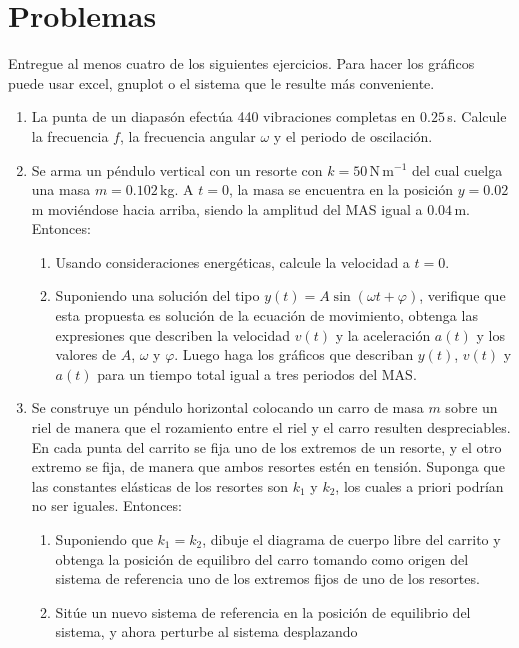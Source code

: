 \documentclass[a4paper,12pt]{article}
\begin{document}
\section{Problemas}

Entregue al menos cuatro de los siguientes ejercicios. Para hacer los gráficos
puede usar excel, gnuplot o el sistema que le resulte más conveniente. 

\begin{enumerate}
	\item La punta de un diapasón efectúa 440 vibraciones completas en
		$0.25$\,s. Calcule la frecuencia $f$, la frecuencia angular $\omega$ y
		el periodo de oscilación. 
	\item Se arma un péndulo vertical con un resorte con $k=50$\,N\,m$^{-1}$
		del cual cuelga una masa $m=0.102$\,kg. A $t=0$, la masa se encuentra
		en la posición $y=0.02$\,m moviéndose hacia arriba, siendo la amplitud
		del MAS igual a $0.04$\,m. Entonces: 
		\begin{enumerate}
			\item Usando consideraciones energéticas, calcule la velocidad a $t=0$. 
			\item Suponiendo una solución del tipo $y(t)=A \sin(\omega t +
				\varphi)$, verifique que esta propuesta es solución de la
				ecuación de movimiento, obtenga las expresiones que describen
				la velocidad $v(t)$ y la aceleración $a(t)$ y los valores de
				$A$, $\omega$ y $\varphi$. Luego haga los gráficos que
				describan $y(t)$, $v(t)$ y $a(t)$ para un tiempo total igual a
				tres periodos del MAS.
		\end{enumerate}
	\item Se construye un péndulo horizontal colocando un carro de masa $m$
		sobre un riel de manera que el rozamiento entre el riel y el carro
		resulten despreciables. En cada punta del carrito se fija uno de los
		extremos de un resorte, y el otro extremo se fija, de manera que ambos
		resortes estén en tensión. Suponga que las constantes elásticas de los
		resortes son $k_1$ y $k_2$, los cuales a priori podrían no ser iguales.
		Entonces:
		\begin{enumerate}
			\item Suponiendo que $k_1 = k_2$, dibuje el diagrama de cuerpo
				libre del carrito y obtenga la posición de equilibro del carro
				tomando como origen del sistema de referencia uno de los
				extremos fijos de uno de los resortes. 
			\item Sitúe un nuevo sistema de referencia en la posición de
				equilibrio del sistema, y ahora perturbe al sistema desplazando

\end{enumerate}
\end{enumerate}
\end{document}
